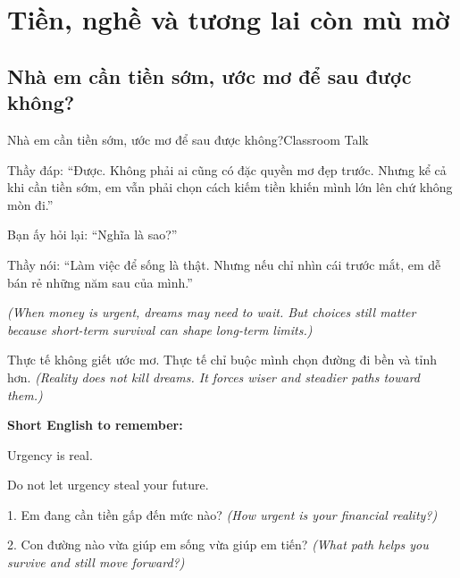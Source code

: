 \chapter{Tiền, nghề và tương lai còn mù mờ}

\section{Nhà em cần tiền sớm, ước mơ để sau được không?}
\begin{truyen}{Nhà em cần tiền sớm, ước mơ để sau được không?}{Classroom Talk}

Thầy đáp: ``Được. Không phải ai cũng có đặc quyền mơ đẹp trước. Nhưng kể cả khi cần tiền sớm, em vẫn phải chọn cách kiếm tiền khiến mình lớn lên chứ không mòn đi.''

Bạn ấy hỏi lại: ``Nghĩa là sao?''

Thầy nói: ``Làm việc để sống là thật. Nhưng nếu chỉ nhìn cái trước mắt, em dễ bán rẻ những năm sau của mình.''

\textit{(When money is urgent, dreams may need to wait. But choices still matter because short-term survival can shape long-term limits.)}
\end{truyen}

\begin{baihoc}
Thực tế không giết ước mơ. Thực tế chỉ buộc mình chọn đường đi bền và tỉnh hơn.
\textit{(Reality does not kill dreams. It forces wiser and steadier paths toward them.)}
\end{baihoc}

\begin{ghinhoanh}
\textbf{Short English to remember:}

Urgency is real.

Do not let urgency steal your future.
\end{ghinhoanh}

\begin{tuhocnhanh}
1. Em đang cần tiền gấp đến mức nào? \textit{(How urgent is your financial reality?)}

2. Con đường nào vừa giúp em sống vừa giúp em tiến? \textit{(What path helps you survive and still move forward?)}
\end{tuhocnhanh}
\ngancach

